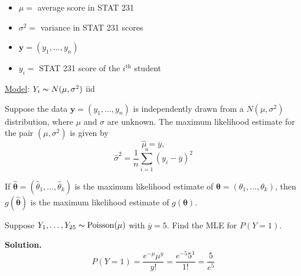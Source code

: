 \begin{exbox}
    \begin{example} $ \; $
        \begin{itemize}
            \item $ \mu = $ average score in STAT 231
            \item $ \sigma^2= $ variance in STAT 231 scores
            \item $ \bm{y}=(y_1,\ldots ,y_n) $
            \item $ y_i= $ STAT 231 score of the $ i^{\text{th}} $ student
        \end{itemize}
        \underline{Model}: $ Y_i \thicksim N(\mu,\sigma^2) $ iid
    \end{example}
\end{exbox}

\begin{thmbox}
    \begin{prop}
        Suppose the data $ \bm{y}=(y_1,\ldots ,y_n) $ is independently
        drawn from a $ N(\mu,\sigma^2) $ distribution,
        where $ \mu $ and $ \sigma $ are unknown. The maximum
        likelihood estimate for the pair $ (\mu,\sigma^2) $ is given by
        \[ \hat{\mu}=\overline{y}, \]
        \[ \hat{\sigma}^2=\frac{1}{n} \sum\limits_{i=1}^{n} \left( y_i-\overline{y} \right)^2 \]
    \end{prop}
\end{thmbox}

\begin{thmbox}
    \begin{theorem}
        If $ \hat{\bm{\theta}}=(\hat{\theta}_1,\ldots ,\hat{\theta}_k) $ is the maximum likelihood
        estimate of $ \bm{\theta}=(\theta_1,\ldots ,\theta_k) $, then
        $ g(\bm{\hat{\theta}}) $ is the maximum likelihood estimate of $ g(\bm{\theta}) $.
    \end{theorem}
\end{thmbox}

\begin{exbox}
    \begin{example}
        Suppose $ Y_1,\ldots ,Y_{25} \thicksim \operatorname{Poisson}(\mu) $ with $ \overline{y}=5 $.
        Find the MLE for $ P(Y=1) $.

        \textbf{Solution.}
        \[ P(Y=1)=\frac{e^{-\mu}\mu^y}{y!}=\frac{e^{-5}5^1}{1!}=\frac{5}{e^5} \]
    \end{example}
\end{exbox}

